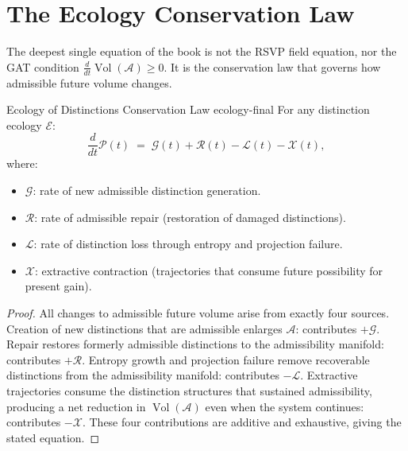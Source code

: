 \documentclass[12pt,twoside,openright]{book}
\newcommand{\adm}{\mathcal{A}}
\newcommand{\Vol}{\operatorname{Vol}}
\begin{document}
\section{The Ecology Conservation Law}
\label{sec:ch30-conservation}

The deepest single equation of the book is not the
RSVP field equation, nor the GAT condition
$\frac{d}{dt}\Vol(\adm) \ge 0$.
It is the conservation law that governs how admissible
future volume changes.

\begin{theorem}{Ecology of Distinctions Conservation Law}%
  {ecology-final}
  For any distinction ecology $\mathcal{E}$:
  \[
    \frac{d}{dt}\mathcal{P}(t)
    \;=\;
    \mathcal{G}(t) + \mathcal{R}(t)
    - \mathcal{L}(t) - \mathcal{X}(t),
  \]
  where:
  \begin{itemize}[nosep]
    \item $\mathcal{G}$: rate of new admissible
          distinction generation.
    \item $\mathcal{R}$: rate of admissible repair
          (restoration of damaged
          distinctions).
    \item $\mathcal{L}$: rate of distinction loss
          through entropy and projection failure.
    \item $\mathcal{X}$: extractive contraction
          (trajectories that consume future possibility
          for present gain).
  \end{itemize}
\end{theorem}

\begin{proof}
  All changes to admissible future volume arise from
  exactly four sources.
  Creation of new distinctions that are admissible
  enlarges $\adm$: contributes $+\mathcal{G}$.
  Repair restores formerly admissible distinctions
  to the admissibility manifold: contributes $+\mathcal{R}$.
  Entropy growth and projection failure remove recoverable
  distinctions from the admissibility manifold:
  contributes $-\mathcal{L}$.
  Extractive trajectories consume the distinction
  structures that sustained admissibility, producing
  a net reduction in $\Vol(\adm)$ even when the system
  continues: contributes $-\mathcal{X}$.
  These four contributions are additive and exhaustive,
  giving the stated equation.
\end{proof}
\end{document}
